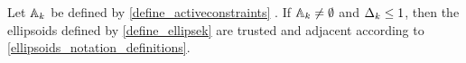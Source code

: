 \begin{lemma}
\label{ellsoid_is_suitable_theorem_p2}
Let ${\mathbb A_{k}}$ 
be defined by 
\cref{define_activeconstraints}
.
If ${\mathbb A_{k}} \ne \emptyset$ and $\Delta_k \le 1$, 
then the ellipsoids defined by \cref{define_ellipsek} are trusted and adjacent according to \cref{ellipsoids_notation_definitions}.

\end{lemma}
